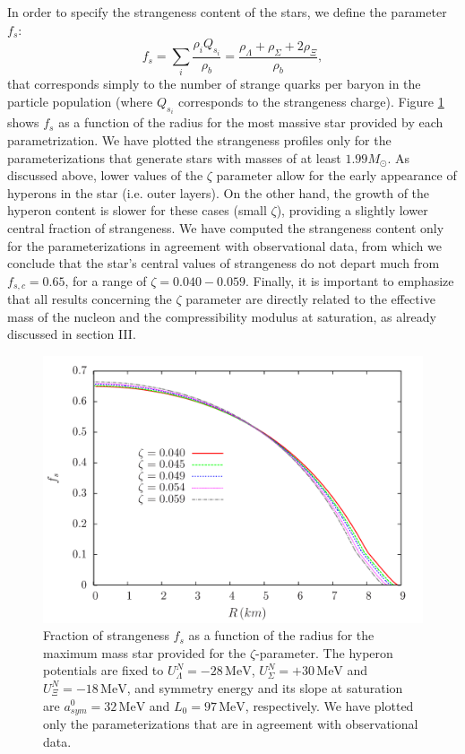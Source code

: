 \documentclass[twocolumn,showpacs,aps]{revtex4}
\begin{document}
In order to specify the strangeness content of the stars, we define the parameter $f_s$:
\begin{equation}\label{strangeness}
f_s= \sum_{i}\frac{\rho_{i}Q_{s_{i}}}{\rho_{b}}=\frac{\rho_{\Lambda}+\rho_{\Sigma}+2\rho_{\Xi}}{\rho_{b}},
\end{equation}
that corresponds simply to the number of strange quarks per baryon in the particle population (where $Q_{s_{i}}$ corresponds to the strangeness charge).
Figure \ref{fs_lambda} shows $f_s$ as a function of 
the radius for the most massive star provided by each parametrization. 
We have plotted the strangeness profiles only for the parameterizations that generate
stars with masses of at least $1.99M_{\odot}$. 
As discussed above, lower values of the $\zeta$ parameter allow for the early appearance
of hyperons in the star (i.e. outer layers). 
On the other hand, the growth of the hyperon content is slower for these cases (small $\zeta$),
providing a slightly lower central fraction of strangeness.
We have computed the strangeness content only for the parameterizations in agreement with 
observational data, from which we conclude that the star's central values of strangeness do not depart much from 
$f_{s,c}=0.65$, for a range of $\zeta=0.040-0.059$. 
Finally, it is important to emphasize that all results concerning the $\zeta$ parameter are directly related to
the effective mass of the nucleon and the compressibility modulus at saturation, 
as already discussed in section III.
 
 \begin{figure}
 \centering
 \vspace{1.0cm}
 \includegraphics[width=9.cm]{fs_paper_lambda.png}
 \caption{\label{fs_lambda} Fraction of strangeness $f_s$ as a function of the radius for the maximum mass star provided for the $\zeta$-parameter. 
 The hyperon potentials are fixed to $U_{\Lambda}^N=-28 \,\mathrm{MeV}$, $U_{\Sigma}^N=+30\,\mathrm{MeV} $ and $U_{\Xi}^N=-18\,\mathrm{MeV} $, 
 and symmetry energy and its slope at saturation are $a_{sym}^0= 32 \,\mathrm{MeV}$ and $L_0=97\,\mathrm{MeV}$, respectively. 
 We have plotted only the parameterizations that are in agreement with observational data.}
 \end{figure}
 
\end{document}
